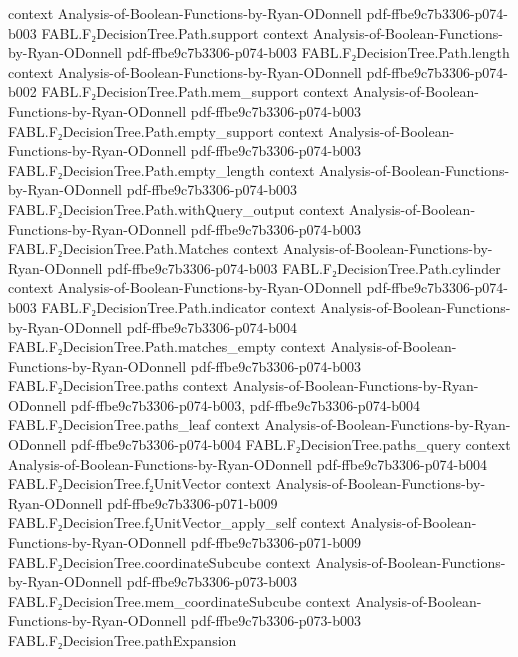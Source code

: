\begin{theorem}
  {context}
  {Analysis-of-Boolean-Functions-by-Ryan-ODonnell}
  {pdf-ffbe9c7b3306-p074-b003}
\proofstep
  {FABL.F₂DecisionTree.Path.support}
  {context}
  {Analysis-of-Boolean-Functions-by-Ryan-ODonnell}
  {pdf-ffbe9c7b3306-p074-b003}
\proofstep
  {FABL.F₂DecisionTree.Path.length}
  {context}
  {Analysis-of-Boolean-Functions-by-Ryan-ODonnell}
  {pdf-ffbe9c7b3306-p074-b002}
\proofstep
  {FABL.F₂DecisionTree.Path.mem_support}
  {context}
  {Analysis-of-Boolean-Functions-by-Ryan-ODonnell}
  {pdf-ffbe9c7b3306-p074-b003}
\proofstep
  {FABL.F₂DecisionTree.Path.empty_support}
  {context}
  {Analysis-of-Boolean-Functions-by-Ryan-ODonnell}
  {pdf-ffbe9c7b3306-p074-b003}
\proofstep
  {FABL.F₂DecisionTree.Path.empty_length}
  {context}
  {Analysis-of-Boolean-Functions-by-Ryan-ODonnell}
  {pdf-ffbe9c7b3306-p074-b003}
\proofstep
  {FABL.F₂DecisionTree.Path.withQuery_output}
  {context}
  {Analysis-of-Boolean-Functions-by-Ryan-ODonnell}
  {pdf-ffbe9c7b3306-p074-b003}
\proofstep
  {FABL.F₂DecisionTree.Path.Matches}
  {context}
  {Analysis-of-Boolean-Functions-by-Ryan-ODonnell}
  {pdf-ffbe9c7b3306-p074-b003}
\proofstep
  {FABL.F₂DecisionTree.Path.cylinder}
  {context}
  {Analysis-of-Boolean-Functions-by-Ryan-ODonnell}
  {pdf-ffbe9c7b3306-p074-b003}
\proofstep
  {FABL.F₂DecisionTree.Path.indicator}
  {context}
  {Analysis-of-Boolean-Functions-by-Ryan-ODonnell}
  {pdf-ffbe9c7b3306-p074-b004}
\proofstep
  {FABL.F₂DecisionTree.Path.matches_empty}
  {context}
  {Analysis-of-Boolean-Functions-by-Ryan-ODonnell}
  {pdf-ffbe9c7b3306-p074-b003}
\proofstep
  {FABL.F₂DecisionTree.paths}
  {context}
  {Analysis-of-Boolean-Functions-by-Ryan-ODonnell}
  {pdf-ffbe9c7b3306-p074-b003,
    pdf-ffbe9c7b3306-p074-b004}
\proofstep
  {FABL.F₂DecisionTree.paths_leaf}
  {context}
  {Analysis-of-Boolean-Functions-by-Ryan-ODonnell}
  {pdf-ffbe9c7b3306-p074-b004}
\proofstep
  {FABL.F₂DecisionTree.paths_query}
  {context}
  {Analysis-of-Boolean-Functions-by-Ryan-ODonnell}
  {pdf-ffbe9c7b3306-p074-b004}
\proofstep
  {FABL.F₂DecisionTree.f₂UnitVector}
  {context}
  {Analysis-of-Boolean-Functions-by-Ryan-ODonnell}
  {pdf-ffbe9c7b3306-p071-b009}
\proofstep
  {FABL.F₂DecisionTree.f₂UnitVector_apply_self}
  {context}
  {Analysis-of-Boolean-Functions-by-Ryan-ODonnell}
  {pdf-ffbe9c7b3306-p071-b009}
\proofstep
  {FABL.F₂DecisionTree.coordinateSubcube}
  {context}
  {Analysis-of-Boolean-Functions-by-Ryan-ODonnell}
  {pdf-ffbe9c7b3306-p073-b003}
\proofstep
  {FABL.F₂DecisionTree.mem_coordinateSubcube}
  {context}
  {Analysis-of-Boolean-Functions-by-Ryan-ODonnell}
  {pdf-ffbe9c7b3306-p073-b003}
\proofstep
  {FABL.F₂DecisionTree.pathExpansion}

\end{theorem}
